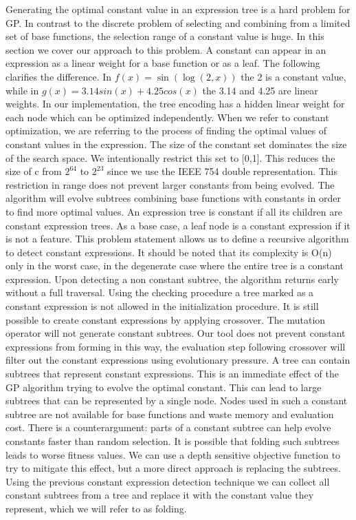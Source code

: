 Generating the optimal constant value in an expression tree is a hard problem for GP. In contrast to the discrete problem of selecting and combining from a limited set of base functions, the selection range of a constant value is huge. In this section we cover our approach to this problem.
A constant can appear in an expression as a linear weight for a base function or as a leaf. The following clarifies the difference. In $ f(x) = \sin(\log(2, x))$ the 2 is a constant value, while in $ g(x) = 3.14 sin(x) + 4.25 cos(x)$ the 3.14 and 4.25 are linear weights. In our implementation, the tree encoding has a hidden linear weight for each node which can be optimized independently. When we refer to constant optimization, we are referring to the process of finding the optimal values of constant values in the expression.
The size of the constant set dominates the size of the search space. We intentionally restrict this set to [0,1]. This reduces the size of c from $2^{64}$ to $2^{23}$ since we use the IEEE 754 double representation. This restriction in range does not prevent larger constants from being evolved. The algorithm will evolve subtrees combining base functions with constants in order to find more optimal values.
An expression tree is constant if all its children are constant expression trees. As a base case, a leaf node is a constant expression if it is not a feature. This problem statement allows us to define a recursive algorithm to detect constant expressions. It should be noted that its complexity is O(n) only in the worst case, in the degenerate case where the entire tree is a constant expression. Upon detecting a non constant subtree, the algorithm returns early without a full traversal. 
Using the checking procedure a tree marked as a constant expression is not allowed in the initialization procedure. It is still possible to create constant expressions by applying crossover. The mutation operator will not generate constant subtrees. Our tool does not prevent constant expressions from forming in this way, the evaluation step following crossover will filter out the constant expressions using evolutionary pressure. A tree can contain subtrees that represent constant expressions. This is an immediate effect of the GP algorithm trying to evolve the optimal constant. This can lead to large subtrees that can be represented by a single node. Nodes used in such a constant subtree are not available for base functions and  waste memory and evaluation cost. There is a counterargument: parts of a constant subtree can help evolve constants faster than random selection. It is possible that folding such subtrees leads to worse fitness values. We can use a depth sensitive objective function to try to mitigate this effect, but a more direct approach is replacing the subtrees. Using the previous constant expression detection technique we can collect all constant subtrees from a tree and replace it with the constant value they represent, which we will refer to as folding.
